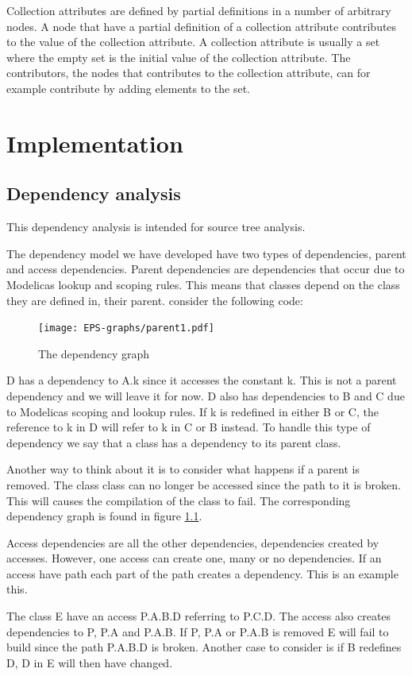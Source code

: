 \documentclass{cslthse-msc}
\begin{document}
Collection attributes are defined by partial definitions in a number of arbitrary nodes. A node that have a partial definition of a collection attribute contributes to the value of the collection attribute. A collection attribute is usually a set where the empty set is the initial value of the collection attribute. The contributors, the nodes that contributes to the collection attribute, can for example contribute by adding elements to the set.~\cite{magnusson2007extending}

\chapter[Implementation]{Implementation}

\section{Dependency analysis}

This dependency analysis is intended for source tree analysis.

The dependency model we have developed have two types of dependencies, parent and access dependencies. Parent dependencies are dependencies that occur due to Modelicas lookup and scoping rules. This means that classes depend on the class they are defined in, their parent. consider the following code:


\begin{figure}
    \centering
    \texttt{[image: EPS-graphs/parent1.pdf]}
  \caption{The dependency graph}
  \label{fig:parent1graph}
\end{figure}

D has a dependency to A.k since it accesses the constant k. This is not a parent dependency and we will leave it for now. D also has dependencies to B and C due to Modelicas scoping and lookup rules. If k is redefined in either B or C, the reference to k in D will refer to k in C or B instead. To handle this type of dependency we say that a class has a dependency to its parent class.

Another way to think about it is to consider what happens if a parent is removed. The class class can no longer be accessed since the path to it is broken. This will causes the compilation of the class to fail. The corresponding dependency graph is found in figure \ref{fig:parent1graph}.

Access dependencies are all the other dependencies, dependencies created by accesses. However, one access can create one, many or no dependencies. If an access have path each part of the path creates a dependency. This is an example this.

The class E have an access P.A.B.D referring to P.C.D. The access also creates dependencies to P, P.A and P.A.B. If P, P.A or P.A.B is removed E will fail to build since the path P.A.B.D is broken. Another case to consider is if B redefines D, D in E will then have changed.
\end{document}

